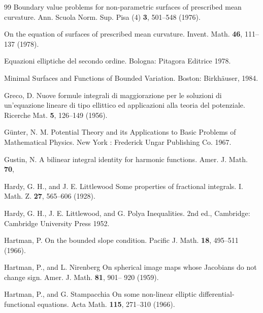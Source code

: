 \begin{thebibliography}{99}
Boundary value problems for non-parametric surfaces of prescribed mean curvature.
Ann. Scuola Norm. Sup. Pisa (4) \textbf{3}, 501--548 (1976).

On the equation of surfaces of prescribed mean curvature. Invent. Math. \textbf{46}, 111--137 (1978).

Equazioni elliptiche del secondo ordine. Bologna: Pitagora Editrice 1978.

Minimal Surfaces and Functions of Bounded Variation. Boston: Birkhäuser, 1984.

Greco, D.
Nuove formule integrali di maggiorazione per le soluzioni di un'equazione lineare di
tipo ellittico ed applicazioni alla teoria del potenziale. Ricerche Mat. \textbf{5}, 126--149 (1956).

Günter, N. M.
Potential Theory and its Applications to Basic Problems of Mathematical Physics. New
York : Frederick Ungar Publishing Co. 1967.

Gustin, N.
A bilinear integral identity for harmonic functions. Amer. J. Math. \textbf{70}, %

Hardy, G. H., and J. E. Littlewood
Some properties of fractional integrals. I. Math. Z. \textbf{27}, 565--606 (1928).

Hardy, G. H., J. E. Littlewood, and G. Polya
Inequalities. 2nd ed., Cambridge: Cambridge University Press 1952.

Hartman, P.
On the bounded slope condition. Pacific J. Math. \textbf{18}, 495--511 (1966).

Hartman, P., and L. Nirenberg
On spherical image maps whose Jacobians do not change sign. Amer. J. Math. \textbf{81}, 901--
920 (1959).

Hartman, P., and G. Stampacchia
On some non-linear elliptic differential-functional equations. Acta Math. \textbf{115}, 271--310
(1966).

\end{thebibliography}


